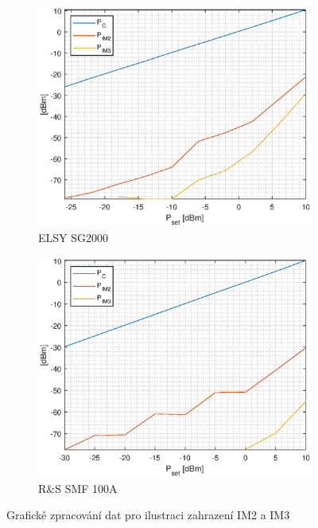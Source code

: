 \documentclass[11pt,a4paper]{article}
\begin{document}
\begin{figure}[!ht]
    \centering
\begin{subfigure}{0.45\textwidth}
    \centering
    \includegraphics[width=\textwidth]{src/ELSY-SG2000-intermodulation.eps}
    \caption{ELSY SG2000}
    \label{fig:elsy-sg2000-intermodulation}
\end{subfigure}
\begin{subfigure}{0.45\textwidth}
    \centering
    \includegraphics[width=\textwidth]{src/RS-SMF-100A-intermodulation.eps}
    \caption{R\&S SMF 100A}
    \label{fig:rs-smf-100a-intermodulation}
\end{subfigure}
\caption{Grafické zpracování dat pro ilustraci zahrazení IM2 a IM3}
\end{figure}
\end{document}
